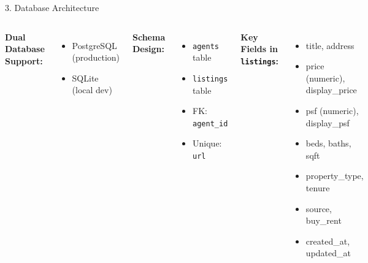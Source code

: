\documentclass[aspectratio=169,10pt]{beamer}
\begin{document}
\begin{frame}{3. Database Architecture}
    \begin{columns}[T]
        \textbf{Dual Database Support:}
        \begin{itemize}
            \item PostgreSQL (production)
            \item SQLite (local dev)
        \end{itemize}
        
        \vspace{0.3cm}
        
        \textbf{Schema Design:}
        \begin{itemize}
            \item \texttt{agents} table
            \item \texttt{listings} table
            \item FK: \texttt{agent\_id}
            \item Unique: \texttt{url}
        \end{itemize}
        
        \textbf{Key Fields in \texttt{listings}:}
        \begin{itemize}
            \item title, address
            \item price (numeric), display\_price
            \item psf (numeric), display\_psf
            \item beds, baths, sqft
            \item property\_type, tenure
            \item source, buy\_rent
            \item created\_at, updated\_at
        \end{itemize}
    \end{columns}
\end{frame}
\end{document}
